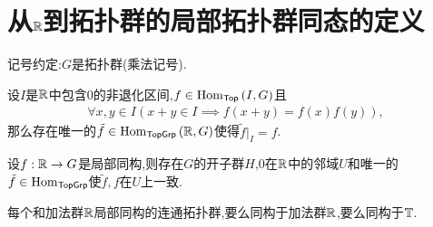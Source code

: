 \section{从\texorpdfstring{$\mathbb{R}$}{R}到拓扑群的局部拓扑群同态的定义}

记号约定:$G$是拓扑群(乘法记号).

\begin{proposition}{}{}
	设$I$是$\mathbb{R}$中包含$0$的非退化区间,$f\in\operatorname{Hom}_{\mathsf{Top}}\left(I,G\right)$且
	\begin{align*}
		\forall x,y\in I\left(x+y\in I\implies f\left(x+y\right)=f\left(x\right)f\left(y\right)\right),
	\end{align*}
	那么存在唯一的$\tilde{f}\in\operatorname{Hom}_{\mathsf{TopGrp}}\left(\mathbb{R},G\right)$使得$\tilde{f}|_{I}=f$.
\end{proposition}

\begin{corollary}{}{}
	设$f:\mathbb{R}\to G$是局部同构,则存在$G$的开子群$H$,$0$在$\mathbb{R}$中的邻域$U$和唯一的$\tilde{f}\in\operatorname{Hom}_{\mathsf{TopGrp}}$使$\tilde{f},f$在$U$上一致.
\end{corollary}

\begin{proposition}{}{}
	每个和加法群$\mathbb{R}$局部同构的连通拓扑群,要么同构于加法群$\mathbb{R}$,要么同构于$\mathbb{T}$.
\end{proposition}